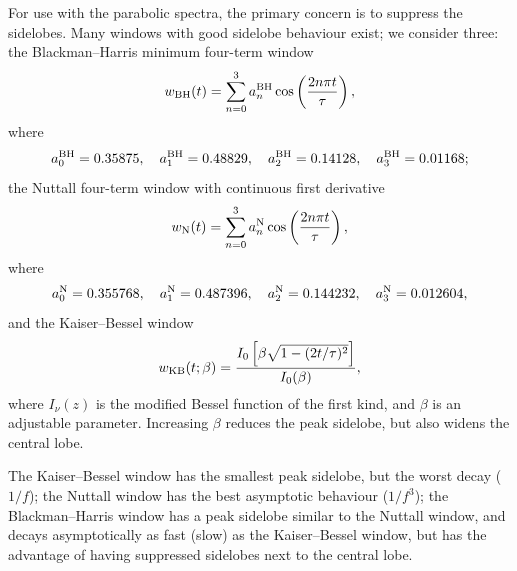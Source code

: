For use with the parabolic spectra, the primary concern is to suppress the sidelobes. Many windows with good sidelobe behaviour exist; we consider three: the Blackman--Harris minimum four-term window \citep{Harris1978, Nuttall1981}
\begin{equation}
w_\mathrm{BH}(t) = \sum_{n=0}^{3} a^\mathrm{BH}_n\cos\left(\frac{2n\pi t}{\tau}\right),
\end{equation}
where
\begin{equation}
a^\mathrm{BH}_0 = 0.35875, \quad a^\mathrm{BH}_1 = 0.48829, \quad
a^\mathrm{BH}_2 = 0.14128, \quad a^\mathrm{BH}_3 = 0.01168;
\end{equation}
the Nuttall four-term window with continuous first derivative \citep{Nuttall1981}
\begin{equation}
w_\mathrm{N}(t) = \sum_{n=0}^{3} a^\mathrm{N}_n\cos\left(\frac{2n\pi t}{\tau}\right),
\end{equation}
where
\begin{equation}
a^\mathrm{N}_0 = 0.355768, \quad a^\mathrm{N}_1 = 0.487396, \quad
a^\mathrm{N}_2 = 0.144232, \quad a^\mathrm{N}_3 = 0.012604,
\end{equation}
and the Kaiser--Bessel window \citep{Harris1978, Kaiser1980}
\begin{equation}
w_\mathrm{KB}(t;\beta) = \frac{I_0\left[\beta\sqrt{1 - (2 t/\tau)^2}\right]}{I_0(\beta)},
\end{equation}
where $I_\nu(z)$ is the modified Bessel function of the first kind, and $\beta$ is an adjustable parameter. Increasing $\beta$ reduces the peak sidelobe, but also widens the central lobe.

The Kaiser--Bessel window has the smallest peak sidelobe, but the worst decay ($1/f$); the Nuttall window has the best asymptotic behaviour ($1/f^3$); the Blackman--Harris window has a peak sidelobe similar to the Nuttall window, and decays asymptotically as fast (slow) as the Kaiser--Bessel window, but has the advantage of having suppressed sidelobes next to the central lobe.

